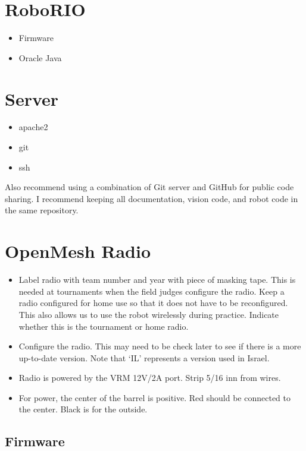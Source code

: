 \section*{RoboRIO}
\begin{itemize}
\item Firmware
\item Oracle Java
\end{itemize}


\section*{Server}
\begin{itemize}
\item apache2
\item git
\item ssh
\end{itemize}



Also recommend using a combination of Git server and GitHub for public code sharing.
%
I recommend keeping all documentation, vision code, and robot code in the same repository.



\newpage\section*{OpenMesh Radio}

\begin{itemize}
\item Label radio with team number and year with piece of masking tape. This is needed at tournaments when the field judges configure the radio. Keep a radio configured for home use so that it does not have to be reconfigured. This also allows us to use the robot wirelessly during practice. Indicate whether this is the tournament or home radio.

\item Configure the radio. This may need to be check later to see if there is a more up-to-date version. Note that `IL' represents a version used in Israel.

\item Radio is powered by the VRM 12V/2A port. Strip 5/16 inn from wires.

\item For power, the center of the barrel is positive. Red should be connected to the center. Black is for the outside.
\end{itemize}


\subsection*{Firmware}

